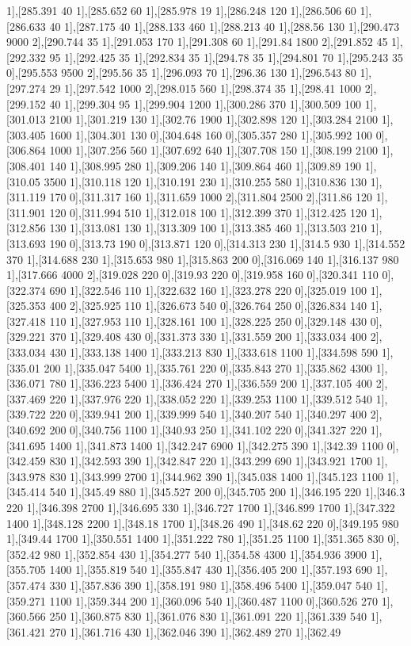 {1],[285.391 40 1],[285.652 60 1],[285.978 19 1],[286.248 120 1],[286.506 60 1],[286.633 40 1],[287.175 40 1],[288.133 460 1],[288.213 40 1],[288.56 130 1],[290.473 9000 2],[290.744 35 1],[291.053 170 1],[291.308 60 1],[291.84 1800 2],[291.852 45 1],[292.332 95 1],[292.425 35 1],[292.834 35 1],[294.78 35 1],[294.801 70 1],[295.243 35 0],[295.553 9500 2],[295.56 35 1],[296.093 70 1],[296.36 130 1],[296.543 80 1],[297.274 29 1],[297.542 1000 2],[298.015 560 1],[298.374 35 1],[298.41 1000 2],[299.152 40 1],[299.304 95 1],[299.904 1200 1],[300.286 370 1],[300.509 100 1],[301.013 2100 1],[301.219 130 1],[302.76 1900 1],[302.898 120 1],[303.284 2100 1],[303.405 1600 1],[304.301 130 0],[304.648 160 0],[305.357 280 1],[305.992 100 0],[306.864 1000 1],[307.256 560 1],[307.692 640 1],[307.708 150 1],[308.199 2100 1],[308.401 140 1],[308.995 280 1],[309.206 140 1],[309.864 460 1],[309.89 190 1],[310.05 3500 1],[310.118 120 1],[310.191 230 1],[310.255 580 1],[310.836 130 1],[311.119 170 0],[311.317 160 1],[311.659 1000 2],[311.804 2500 2],[311.86 120 1],[311.901 120 0],[311.994 510 1],[312.018 100 1],[312.399 370 1],[312.425 120 1],[312.856 130 1],[313.081 130 1],[313.309 100 1],[313.385 460 1],[313.503 210 1],[313.693 190 0],[313.73 190 0],[313.871 120 0],[314.313 230 1],[314.5 930 1],[314.552 370 1],[314.688 230 1],[315.653 980 1],[315.863 200 0],[316.069 140 1],[316.137 980 1],[317.666 4000 2],[319.028 220 0],[319.93 220 0],[319.958 160 0],[320.341 110 0],[322.374 690 1],[322.546 110 1],[322.632 160 1],[323.278 220 0],[325.019 100 1],[325.353 400 2],[325.925 110 1],[326.673 540 0],[326.764 250 0],[326.834 140 1],[327.418 110 1],[327.953 110 1],[328.161 100 1],[328.225 250 0],[329.148 430 0],[329.221 370 1],[329.408 430 0],[331.373 330 1],[331.559 200 1],[333.034 400 2],[333.034 430 1],[333.138 1400 1],[333.213 830 1],[333.618 1100 1],[334.598 590 1],[335.01 200 1],[335.047 5400 1],[335.761 220 0],[335.843 270 1],[335.862 4300 1],[336.071 780 1],[336.223 5400 1],[336.424 270 1],[336.559 200 1],[337.105 400 2],[337.469 220 1],[337.976 220 1],[338.052 220 1],[339.253 1100 1],[339.512 540 1],[339.722 220 0],[339.941 200 1],[339.999 540 1],[340.207 540 1],[340.297 400 2],[340.692 200 0],[340.756 1100 1],[340.93 250 1],[341.102 220 0],[341.327 220 1],[341.695 1400 1],[341.873 1400 1],[342.247 6900 1],[342.275 390 1],[342.39 1100 0],[342.459 830 1],[342.593 390 1],[342.847 220 1],[343.299 690 1],[343.921 1700 1],[343.978 830 1],[343.999 2700 1],[344.962 390 1],[345.038 1400 1],[345.123 1100 1],[345.414 540 1],[345.49 880 1],[345.527 200 0],[345.705 200 1],[346.195 220 1],[346.3 220 1],[346.398 2700 1],[346.695 330 1],[346.727 1700 1],[346.899 1700 1],[347.322 1400 1],[348.128 2200 1],[348.18 1700 1],[348.26 490 1],[348.62 220 0],[349.195 980 1],[349.44 1700 1],[350.551 1400 1],[351.222 780 1],[351.25 1100 1],[351.365 830 0],[352.42 980 1],[352.854 430 1],[354.277 540 1],[354.58 4300 1],[354.936 3900 1],[355.705 1400 1],[355.819 540 1],[355.847 430 1],[356.405 200 1],[357.193 690 1],[357.474 330 1],[357.836 390 1],[358.191 980 1],[358.496 5400 1],[359.047 540 1],[359.271 1100 1],[359.344 200 1],[360.096 540 1],[360.487 1100 0],[360.526 270 1],[360.566 250 1],[360.875 830 1],[361.076 830 1],[361.091 220 1],[361.339 540 1],[361.421 270 1],[361.716 430 1],[362.046 390 1],[362.489 270 1],[362.49 }
